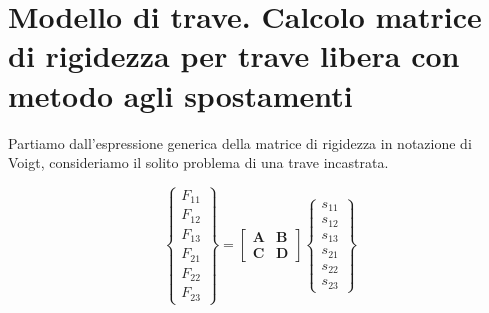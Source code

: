 \section{Modello di trave. Calcolo matrice di rigidezza per trave libera con metodo agli spostamenti}

Partiamo dall'espressione generica della matrice di rigidezza in notazione di Voigt, consideriamo il solito problema di una trave incastrata.


\begin{equation*}
\left\{
\begin{array}{c}
F_{11}\\
F_{12} \\
F_{13} \\
F_{21} \\
F_{22} \\
F_{23}
\end{array}
\right\}
=
\begin{bmatrix}
\mathbf{A} & \mathbf{B} \\
\mathbf{C} & \mathbf{D}
\end{bmatrix}
\left\{
\begin{array}{c}
s_{11} \\
s_{12} \\
s_{13} \\
s_{21} \\
s_{22} \\
s_{23}
\end{array}
\right\}
\end{equation*}

